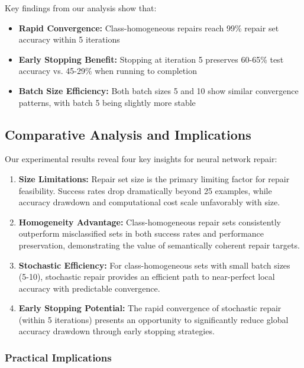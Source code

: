 \documentclass{article}
\begin{document}
Key findings from our analysis show that:
\begin{itemize}
	\item \textbf{Rapid Convergence:} Class-homogeneous repairs reach 99\% repair set accuracy within 5 iterations
	\item \textbf{Early Stopping Benefit:} Stopping at iteration 5 preserves 60-65\% test accuracy vs. 45-29\% when running to completion
	\item \textbf{Batch Size Efficiency:} Both batch sizes 5 and 10 show similar convergence patterns, with batch 5 being slightly more stable
\end{itemize}

\subsection{Comparative Analysis and Implications}

Our experimental results reveal four key insights for neural network repair:

\begin{enumerate}
	\item \textbf{Size Limitations:} Repair set size is the primary limiting factor for repair feasibility. Success rates drop dramatically beyond 25 examples, while accuracy drawdown and computational cost scale unfavorably with size.

	\item \textbf{Homogeneity Advantage:} Class-homogeneous repair sets consistently outperform misclassified sets in both success rates and performance preservation, demonstrating the value of semantically coherent repair targets.

	\item \textbf{Stochastic Efficiency:} For class-homogeneous sets with small batch sizes (5-10), stochastic repair provides an efficient path to near-perfect local accuracy with predictable convergence.

	\item \textbf{Early Stopping Potential:} The rapid convergence of stochastic repair (within 5 iterations) presents an opportunity to significantly reduce global accuracy drawdown through early stopping strategies.
\end{enumerate}

\subsubsection{Practical Implications}
\end{document}
